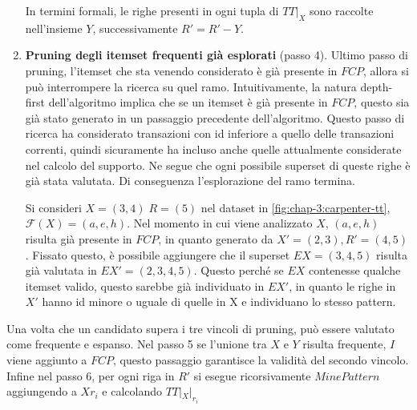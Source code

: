 \begin{enumerate}
    In termini formali, le righe presenti in ogni tupla di \(TT|_X\) sono raccolte nell'insieme \(Y\), successivamente \(R' = R' - Y\).
    
    \item \textbf{Pruning degli itemset frequenti già esplorati} (passo 4).
    Ultimo passo di pruning, l'itemset che sta venendo considerato è già presente in \(FCP\), allora si può interrompere la ricerca su quel ramo.
    Intuitivamente, la natura depth-first dell'algoritmo implica che se un itemset è già presente in \(FCP\), questo sia già stato generato in un passaggio precedente dell'algoritmo.
    Questo passo di ricerca ha considerato transazioni con id inferiore a quello delle transazioni correnti, quindi sicuramente ha incluso anche quelle attualmente considerate nel calcolo del supporto.
    Ne segue che ogni possibile superset di queste righe è già stata valutata.
    Di conseguenza l'esplorazione del ramo termina.
    
    Si consideri \(X = (3, 4) \; R = (5)\) nel dataset in \cref{fig:chap-3:carpenter-tt}, \(\mathcal{F}(X) = (a,e,h)\).
    Nel momento in cui viene analizzato \(X\), \((a,e,h)\) risulta già presente in \(FCP\), in quanto generato da \(X' = (2,3), R' = (4, 5)\).
    Fissato questo, è possibile aggiungere che il superset \(EX = (3,4,5)\) risulta già valutata in \(EX' = (2,3,4,5)\).
    Questo perché se \(EX\) contenesse qualche itemset valido, questo sarebbe già individuato in \(EX'\), in quanto le righe in \(X'\) hanno id minore o uguale di quelle in X e individuano lo stesso pattern.
\end{enumerate}

Una volta che un candidato supera i tre vincoli di pruning, può essere valutato come frequente e espanso.
Nel passo 5 se l'unione tra \(X\) e \(Y\) risulta frequente, \(I\) viene aggiunto a \(FCP\), questo passaggio garantisce la validità del secondo vincolo.
Infine nel passo 6, per ogni riga in \(R'\) si esegue ricorsivamente \(MinePattern\) aggiungendo a \(X r_{i}\) e calcolando \(TT|_{X}|_{r_{i}}\)

